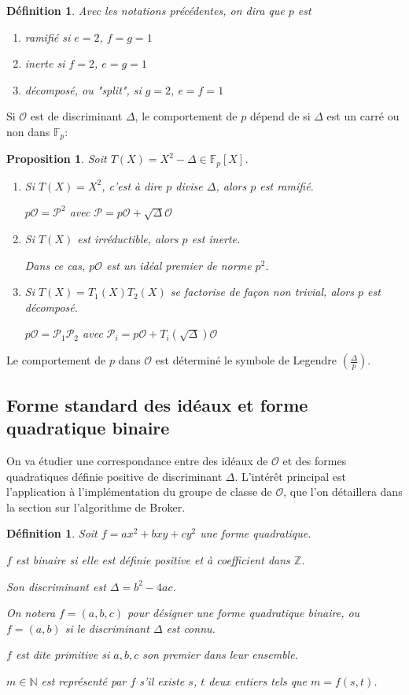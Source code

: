 \documentclass{article}
\newcommand{\N}[0]{\mathbb{N}}
\newcommand{\Z}[0]{\mathbb{Z}}
\newcommand{\OR}[0]{\mathcal{O}}
\newcommand{\PR}[0]{\mathcal{P}}
\newcommand{\F}[0]{\mathbb{F}}
\newtheorem{Prop}[The]{Proposition}
\newtheorem{Def}[The]{Définition}
\begin{document}
\begin{Def}
	Avec les notations précédentes, on dira que $p$ est
	\begin{enumerate}
		\item ramifié si $e = 2$, $f = g = 1$
		\item inerte si $f = 2$, $e = g = 1$
		\item décomposé, ou "split", si $g = 2$, $e = f = 1$
	\end{enumerate}
\end{Def}

Si $\OR$ est de discriminant $\Delta$, le comportement de $p$ dépend de si $\Delta$ est un carré ou non dans $\F_{p}$:

\begin{Prop}
	Soit $T(X) = X^2 - \Delta \in\F_{p}\left[ X\right] $. 
	\begin{enumerate}
		\item Si $T(X) = X^2$, c'est à dire $p$ divise $\Delta$, alors $p$ est ramifié.
		
		$p\OR = \PR^{2}$ avec $\PR = p\OR + \sqrt{\Delta}\OR$
		
		\item Si $T(X)$ est irréductible, alors $p$ est inerte.
		
		Dans ce cas, $p\OR$ est un idéal premier de norme $p^{2}$.
		
		\item Si $T(X) = T_{1}(X)T_{2}(X)$ se factorise de façon non trivial, alors $p$ est décomposé.
		
		$p\OR = \PR_{1}\PR_{2}$ avec $\PR_{i} = p\OR + T_{i}(\sqrt{\Delta})\OR$
	\end{enumerate}
\end{Prop}

Le comportement de $p$ dans $\OR$ est déterminé le symbole de Legendre $\left( \frac{\Delta}{p}\right)$.

\subsection{Forme standard des idéaux et forme quadratique binaire}

On va étudier une correspondance entre des idéaux de $\OR$ et des formes quadratiques définie positive de discriminant $\Delta$. L'intérêt principal est l'application à l’implémentation du groupe de classe de $\OR$, que l'on détaillera dans la section sur l'algorithme de Broker. 

\begin{Def}
	Soit $f = ax^2 + bxy + cy^2$ une forme quadratique.
	
	$f$ est binaire si elle est définie positive et à coefficient dans $\Z$.
	
	Son discriminant est $\Delta = b^2 - 4ac$.
	
	On notera $f = (a,b,c)$ pour désigner une forme quadratique binaire,
	ou $f = (a,b)$ si le discriminant $\Delta$ est connu.  
	
	$f$ est dite primitive si $a,b,c$ son premier dans leur ensemble.
	
	$m\in\N$ est représenté par $f$ s'il existe $s$, $t$ deux entiers tels que $m = f(s,t)$.
\end{Def}
\end{document}

